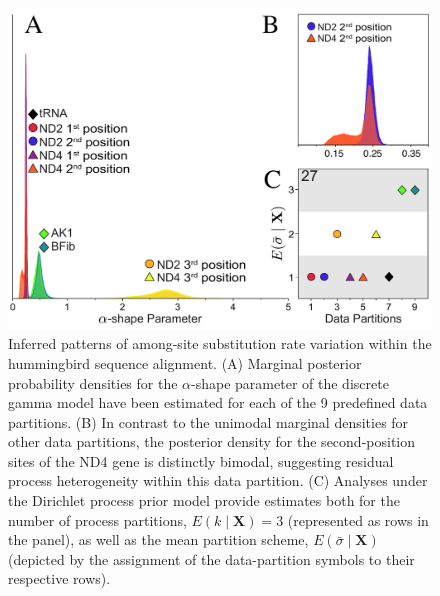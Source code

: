 \documentclass[11pt]{article}
\begin{document}
\begin{figure}[h] 
\centering 
\includegraphics[width=120mm]{figure_1.pdf} 
\caption{Inferred patterns of among-site substitution rate variation within the hummingbird sequence alignment.  (A) Marginal posterior probability densities for the $\alpha$-shape parameter of the discrete gamma model have been estimated for each of the 9 predefined data partitions.  (B) In contrast to the unimodal marginal densities for other data partitions, the posterior density for the second-position sites of the ND4 gene is distinctly bimodal, suggesting residual process heterogeneity within this data partition.  (C) Analyses under the Dirichlet process prior model provide estimates both for the number of process partitions, $E(k \mid \mathbf{X}) = 3$ (represented as rows in the panel), as well as the mean partition scheme, $E(\bar{\sigma} \mid \mathbf{X})$ (depicted by the assignment of the data-partition symbols to their respective rows).}
\label{results_example}
\end{figure} 

\newpage
\end{document}
